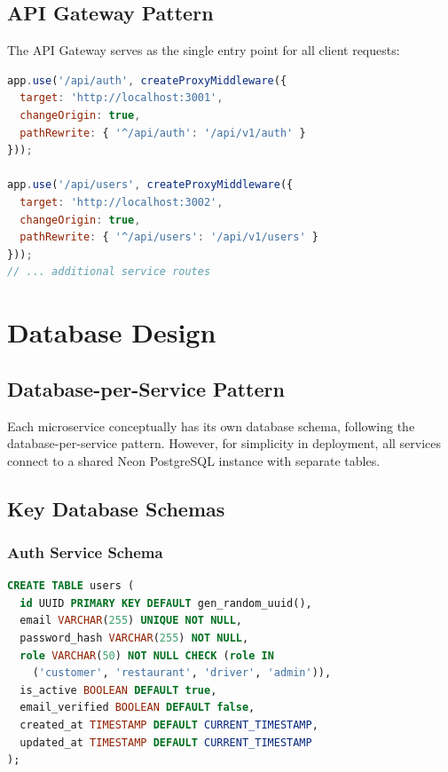 \documentclass[12pt,a4paper]{article}
\begin{document}
\subsection{API Gateway Pattern}

The API Gateway serves as the single entry point for all client requests:

\begin{lstlisting}[language=JavaScript, caption=API Gateway Configuration]
app.use('/api/auth', createProxyMiddleware({ 
  target: 'http://localhost:3001',
  changeOrigin: true,
  pathRewrite: { '^/api/auth': '/api/v1/auth' }
}));

app.use('/api/users', createProxyMiddleware({ 
  target: 'http://localhost:3002',
  changeOrigin: true,
  pathRewrite: { '^/api/users': '/api/v1/users' }
}));
// ... additional service routes
\end{lstlisting}

\section{Database Design}

\subsection{Database-per-Service Pattern}

Each microservice conceptually has its own database schema, following the database-per-service pattern. However, for simplicity in deployment, all services connect to a shared Neon PostgreSQL instance with separate tables.

\subsection{Key Database Schemas}

\subsubsection{Auth Service Schema}
\begin{lstlisting}[language=SQL, caption=Users Table]
CREATE TABLE users (
  id UUID PRIMARY KEY DEFAULT gen_random_uuid(),
  email VARCHAR(255) UNIQUE NOT NULL,
  password_hash VARCHAR(255) NOT NULL,
  role VARCHAR(50) NOT NULL CHECK (role IN 
    ('customer', 'restaurant', 'driver', 'admin')),
  is_active BOOLEAN DEFAULT true,
  email_verified BOOLEAN DEFAULT false,
  created_at TIMESTAMP DEFAULT CURRENT_TIMESTAMP,
  updated_at TIMESTAMP DEFAULT CURRENT_TIMESTAMP
);
\end{lstlisting}
\end{document}
